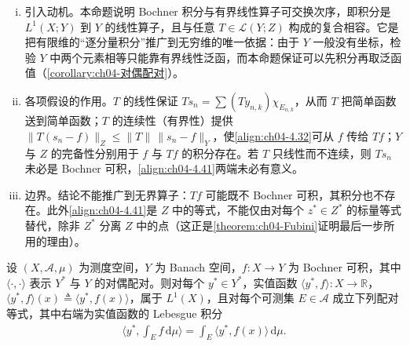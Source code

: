 \documentclass[../../main.tex]{subfiles}%
\begin{document}
\begin{remark}\label{remark:ch04-算子交换积分动机}
\begin{enumerate}[(i)]
\item 引入动机。本命题说明 Bochner 积分与有界线性算子可交换次序，即积分是 $L^1(X;Y)$ 到 $Y$ 的线性算子，且与任意 $T\in\mathcal{L}(Y;Z)$ 构成的复合相容。它是把有限维的“逐分量积分”推广到无穷维的唯一依据：由于 $Y$ 一般没有坐标，检验 $Y$ 中两个元素相等只能靠有界线性泛函，而本命题保证可以先积分再取泛函值（\cref{corollary:ch04-对偶配对}）。

\item 各项假设的作用。$T$ 的线性保证 $Ts_n=\sum(Ty_{n,k})\chi_{E_{n,k}}$，从而 $T$ 把简单函数送到简单函数；$T$ 的连续性（有界性）提供 $\|T(s_n-f)\|_Z\leqslant\|T\|\,\|s_n-f\|_Y$，使\eqref{align:ch04-4.32}可从 $f$ 传给 $Tf$；$Y$ 与 $Z$ 的完备性分别用于 $f$ 与 $Tf$ 的积分存在。若 $T$ 只线性而不连续，则 $Ts_n$ 未必是 Bochner 可积，\eqref{align:ch04-4.41}两端未必有意义。

\item 边界。结论不能推广到无界算子：$Tf$ 可能既不 Bochner 可积，其积分也不存在。此外\eqref{align:ch04-4.41}是 $Z$ 中的等式，不能仅由对每个 $z^*\in Z^*$ 的标量等式替代，除非 $Z^*$ 分离 $Z$ 中的点（这正是\cref{theorem:ch04-Fubini}证明最后一步所用的理由）。
\end{enumerate}
\end{remark}

\begin{corollary}\label{corollary:ch04-对偶配对}
设 $(X,\mathcal{A},\mu)$ 为测度空间，$Y$ 为 Banach 空间，$f:X\to Y$ 为 Bochner 可积，其中 $\langle\cdot,\cdot\rangle$ 表示 $Y^*$ 与 $Y$ 的对偶配对。则对每个 $y^*\in Y^*$，实值函数 $\langle y^*,f\rangle:X\to\mathbb{R}$，$\langle y^*,f\rangle(x)\triangleq \langle y^*,f(x)\rangle$，属于 $L^1(X)$，且对每个可测集 $E\in\mathcal{A}$ 成立下列配对等式，其中右端为实值函数的 Lebesgue 积分
\begin{align}
\Big\langle y^*,\int_E f\,\mathrm{d}\mu\Big\rangle=\int_E\langle y^*,f(x)\rangle\,\mathrm{d}\mu. \label{align:ch04-4.42}
\end{align}
\end{corollary}
\end{document}
